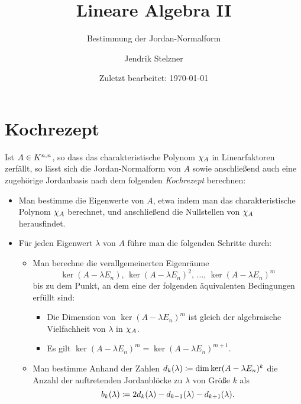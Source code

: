\documentclass[a4paper,10pt,numbers = noenddot]{scrartcl}
\title{Lineare Algebra II}
\subtitle{Bestimmung der Jordan-Normalform}
\author{Jendrik Stelzner}
\date{Zuletzt bearbeitet: \today}
\begin{document}
\maketitle





\section*{Kochrezept}

Ist $A \in \matrices{n}{K}$, so dass das charakteristische Polynom $\charpol{A}$ in Linearfaktoren zerfällt, so lässt sich die Jordan-Normalform von $A$ sowie anschließend auch eine zugehörige Jordanbasis nach dem folgenden \emph{Kochrezept} berechnen:

\begin{itemize}
  \item
    Man bestimme die Eigenwerte von $A$, etwa indem man das charakteristische Polynom $\charpol{A}$ berechnet, und anschließend die Nullstellen von $\charpol{A}$ herausfindet.
    
  \item
    Für jeden Eigenwert $\lambda$ von $A$ führe man die folgenden Schritte durch:
    \begin{itemize}
      \item
        Man berechne die verallgemeinerten Eigenräume
        \[
          \ker (A - \lambda E_n),\,
          \ker (A - \lambda E_n)^2,\,
          \dotsc,\,
          \ker (A - \lambda E_n)^m
        \]
        bis zu dem Punkt, an dem eine der folgenden äquivalenten Bedingungen erfüllt sind:
        \begin{itemize}
          \item
            Die Dimension von $\ker (A - \lambda E_n)^m$ ist gleich der algebraische Vielfachheit von $\lambda$ in $\charpol{A}$.
          \item
            Es gilt $\ker (A - \lambda E_n)^m = \ker (A - \lambda E_n)^{m+1}$.
        \end{itemize}
      \item
        Man bestimme Anhand der Zahlen $d_k(\lambda) \defined \dim \ker (A - \lambda E_n)^k$ die Anzahl der auftretenden Jordanblöcke zu $\lambda$ von Größe $k$ als
        \[
          b_k(\lambda) \defined 2 d_k(\lambda) - d_{k-1}(\lambda) - d_{k+1}(\lambda).
        \]
    \end{itemize}
\end{itemize}
\end{document}
